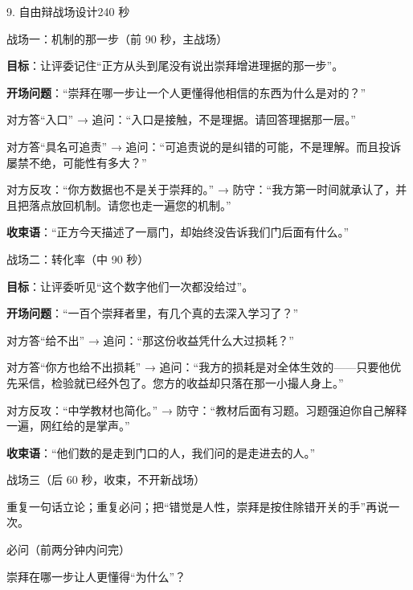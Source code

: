 \documentclass[script,con]{debate}
\begin{document}
\begin{stage}{9. 自由辩战场设计}{240 秒}
\begin{battleground}{战场一：机制的那一步（前 90 秒，主战场）}
\begin{bullets}
\item \textbf{目标}：让评委记住“正方从头到尾没有说出崇拜增进理据的那一步”。
\item \textbf{开场问题}：“崇拜在哪一步让一个人更懂得他相信的东西为什么是对的？”
\item 对方答“入口” → 追问：“入口是接触，不是理据。请回答理据那一层。”
\item 对方答“具名可追责” → 追问：“可追责说的是纠错的可能，不是理解。而且投诉屡禁不绝，可能性有多大？”
\item 对方反攻：“你方数据也不是关于崇拜的。” → 防守：“我方第一时间就承认了，并且把落点放回机制。请您也走一遍您的机制。”
\item \textbf{收束语}：“正方今天描述了一扇门，却始终没告诉我们门后面有什么。”
\end{bullets}
\end{battleground}
\begin{battleground}{战场二：转化率（中 90 秒）}
\begin{bullets}
\item \textbf{目标}：让评委听见“这个数字他们一次都没给过”。
\item \textbf{开场问题}：“一百个崇拜者里，有几个真的去深入学习了？”
\item 对方答“给不出” → 追问：“那这份收益凭什么大过损耗？”
\item 对方答“你方也给不出损耗” → 追问：“我方的损耗是对全体生效的——只要他优先采信，检验就已经外包了。您方的收益却只落在那一小撮人身上。”
\item 对方反攻：“中学教材也简化。” → 防守：“教材后面有习题。习题强迫你自己解释一遍，网红给的是掌声。”
\item \textbf{收束语}：“他们数的是走到门口的人，我们问的是走进去的人。”
\end{bullets}
\end{battleground}
\begin{battleground}{战场三（后 60 秒，收束，不开新战场）}
\begin{bullets}
\item 重复一句话立论；重复必问；把“错觉是人性，崇拜是按住除错开关的手”再说一次。
\end{bullets}
\begin{points}{必问（前两分钟内问完）}
\item 崇拜在哪一步让人更懂得“为什么”？

\end{points}
\end{battleground}
\end{stage}
\end{document}
